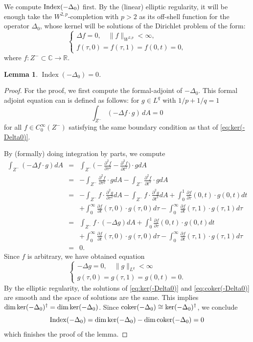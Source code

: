 \documentclass[reqno]{amsart}
\def\R{\ifmmode{\mathbb R}\else{$\mathbb R$}\fi} %
\def\C{\ifmmode{\mathbb C}\else{$\mathbb C$}\fi} %
\newcommand{\be}{\begin{equation}}
\newcommand{\ee}{\end{equation}}
\newcommand{\beastar}{\begin{eqnarray*}}
\newcommand{\eeastar}{\end{eqnarray*}}
\theoremstyle{theorem}
\newtheorem{lem}[thm]{Lemma}
\theoremstyle{definition}
\numberwithin{equation}{section}
\def\R{{\mathbb R}}
\def\C{{\mathbb C}}
\def\R{{\mathbb R}}
\def\C{\mathbb{C}}
\def\R{\ifmmode{\mathbb R}\else{$\mathbb R$}\fi} %
\def\C{\ifmmode{\mathbb C}\else{$\mathbb C$}\fi} %
\def\R{{\mathbb R}}
\def\C{{\mathbb C}}
\def\R{{\mathbb R}}
\def\opname#1{\mathop{\kern0pt{\rm #1}}\nolimits}
\def\dim{\opname{dim}}
\def\Index{\operatorname{Index}}
\begin{document}
We compute ${\rm Index }(-\Delta_0)$ first. By the (linear) elliptic regularity, it will be enough
take the $W^{2,p}$-completion with $p > 2$ as its off-shell function for the operator $\Delta_0$,
whose kernel will be solutions of the Dirichlet problem of the form:
\be\label{eq:ker(-Delta0)}
\begin{cases}
\Delta f=0, \quad \|f\|_{W^{2,p}} < \infty,\\
f(\tau,0)=f(\tau,1)=f(0,t)=0,
\end{cases}
\ee
where $f:Z^-\subset \C \rightarrow \R$.
\begin{lem} $\Index (-\Delta_0) = 0$.
\end{lem}
\begin{proof} For the proof,  we first compute the formal-adjoint of $-\Delta_0$.
This formal adjoint equation can  is defined as follows: for $g \in L^q$ with $1/p + 1/q = 1$
$$
\int_{Z^-} (-\Delta f\cdot g)\, dA = 0
$$
for all $f \in C^\infty_0(Z^-)$ satisfying the same boundary condition as that of
\eqref{eq:ker(-Delta0)}.

By (formally) doing integration by parts, we compute
\beastar
\int_{Z^-} (-\Delta f\cdot g)dA &=& \int_{Z^-} \big(-\frac{\partial^2 f}{\partial \tau^2}-\frac{\partial^2 f}{\partial t^2}\big) \cdot g dA \\
& = & -\int_{Z^-} \frac{\partial^2 f}{\partial \tau^2}\cdot gdA - \int_{Z^-} \frac{\partial^2 f}{\partial t^2}\cdot gdA \\
&=& -\int_{Z^-} f\cdot\frac{\partial^2 g}{\partial \tau^2}dA - \int_{Z^-} f\cdot\frac{\partial^2 g}{\partial t^2}dA
+\int_0^1 \frac{\partial f}{\partial \tau}(0,t)\cdot g(0,t)dt \\
& &+ \int_0^\infty \frac{\partial f}{\partial t}(\tau,0)\cdot g(\tau,0)d\tau - \int_0^\infty \frac{\partial f}{\partial t}(\tau,1)\cdot g(\tau,1)d\tau \\
&=& \int_{Z^-} f\cdot(-\Delta g)dA +\int_0^1 \frac{\partial f}{\partial \tau}(0,t)\cdot g(0,t)dt \\
& & + \int_0^\infty \frac{\partial f}{\partial t}(\tau,0)\cdot g(\tau,0)d\tau - \int_0^\infty \frac{\partial f}{\partial t}(\tau,1)\cdot g(\tau,1)d\tau \\
&=&0.
\eeastar
Since $f$ is arbitrary, we have obtained equation
\be\label{eq:coker(-Delta0)}
\begin{cases}
-\Delta g=0, \quad \|g\|_{L^q} < \infty \\
g(\tau,0)=g(\tau,1)=g(0,t)=0.
\end{cases}
\ee
By the elliptic regularity, the solutions of \eqref{eq:ker(-Delta0)} and \eqref{eq:coker(-Delta0)}
are smooth and the space of solutions are the same.
This implies $\dim {\rm ker}(-\Delta_0)^\dagger = \dim {\rm ker}(-\Delta_0)$.
Since ${\rm coker}(-\Delta_0) \cong \ker(-\Delta_0)^\dagger$,
we conclude 
$$
\Index (-\Delta_0) = \dim {\rm ker}(-\Delta_0) -  \dim {\rm coker}(-\Delta_0) = 0
$$
which finishes the proof of the lemma.
\end{proof}
\end{document}
